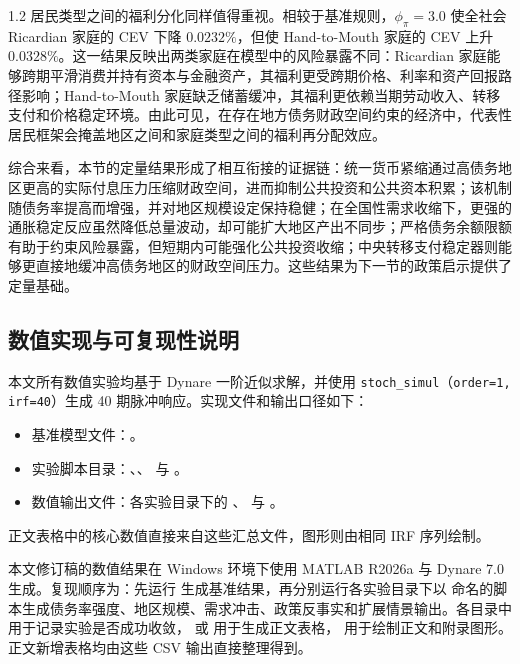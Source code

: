 \documentclass[12pt,UTF8]{ctexart}
\begin{document}
\begin{spacing}{1.2}
		居民类型之间的福利分化同样值得重视。相较于基准规则，$\phi_\pi=3.0$ 使全社会 Ricardian 家庭的 CEV 下降 $0.0232\%$，但使 Hand-to-Mouth 家庭的 CEV 上升 $0.0328\%$。这一结果反映出两类家庭在模型中的风险暴露不同：Ricardian 家庭能够跨期平滑消费并持有资本与金融资产，其福利更受跨期价格、利率和资产回报路径影响；Hand-to-Mouth 家庭缺乏储蓄缓冲，其福利更依赖当期劳动收入、转移支付和价格稳定环境。由此可见，在存在地方债务财政空间约束的经济中，代表性居民框架会掩盖地区之间和家庭类型之间的福利再分配效应。
		
		综合来看，本节的定量结果形成了相互衔接的证据链：统一货币紧缩通过高债务地区更高的实际付息压力压缩财政空间，进而抑制公共投资和公共资本积累；该机制随债务率提高而增强，并对地区规模设定保持稳健；在全国性需求收缩下，更强的通胀稳定反应虽然降低总量波动，却可能扩大地区产出不同步；严格债务余额限额有助于约束风险暴露，但短期内可能强化公共投资收缩；中央转移支付稳定器则能够更直接地缓冲高债务地区的财政空间压力。这些结果为下一节的政策启示提供了定量基础。

		\subsection{数值实现与可复现性说明}

		本文所有数值实验均基于 Dynare 一阶近似求解，并使用 \texttt{stoch\_simul}（\texttt{order=1, irf=40}）生成 40 期脉冲响应。实现文件和输出口径如下：
		\begin{itemize}[leftmargin=2em,itemsep=0.1em]
			\item 基准模型文件：。
			\item 实验脚本目录：、、 与 。
			\item 数值输出文件：各实验目录下的 、 与 。
		\end{itemize}
		正文表格中的核心数值直接来自这些汇总文件，图形则由相同 IRF 序列绘制。

		本文修订稿的数值结果在 Windows 环境下使用 MATLAB R2026a 与 Dynare 7.0 生成。复现顺序为：先运行  生成基准结果，再分别运行各实验目录下以  命名的脚本生成债务率强度、地区规模、需求冲击、政策反事实和扩展情景输出。各目录中  用于记录实验是否成功收敛， 或  用于生成正文表格， 用于绘制正文和附录图形。正文新增表格均由这些 CSV 输出直接整理得到。


\end{spacing}
\end{document}

